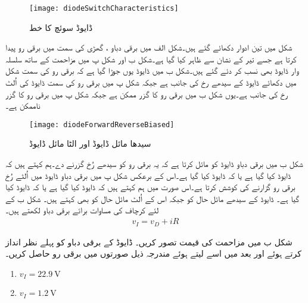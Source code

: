 \begin{figure}
\centering
\texttt{[image: diodeSwitchCharacteristics]}
\caption{ڈایوڈ سوئچ کا خط}
\label{شکل_ڈایوڈ_سوئچ_کا_خط}
\end{figure}
	شکل   میں تین ادوار دکھائے گئے ہیں۔شکل  الف میں برقی دباو ، گھڑی کی سمت میں برقی رو  پیدا کرتا ہے جسے تیر کے نشان سے ظاہر کیا گیا ہے۔شکل  ب اور شکل  پ میں مزاحمت کے ساتھ سلسلہ وار ڈایوڈ   بھی نسب کر دئے گئے ہیں۔شکل  ب میں ڈایوڈ   یوں جوڑا گیا ہے کہ برقی رو  کی سمت شکل   میں دکھائے ڈایوڈ کے سیدھے رخ کی جانب ہے جبکہ شکل  پ میں برقی رو کی سمت ڈایوڈ کی اُلٹ رخ کی جانب ہے۔یوں شکل  ب میں برقی رو  کا گزر ممکن ہے جبکہ شکل  پ میں برقی رو  کا گزر ناممکن ہے۔
\begin{figure}
\centering
\texttt{[image: diodeForwardReverseBiased]}
\caption{سیدھا مائل ڈایوڈ اور الٹا مائل ڈایوڈ}
\label{شکل_ڈایوڈ_سیدھا_مائل_الٹا_مائل}
\end{figure}
شکل  ب میں برقی دباو  ڈایوڈ   کو مائل کرتا ہے کہ یہ برقی رو کو سیدھے رُخ گزرنے دے۔ہم کہتے ہیں کہ ڈایوڈ     کیا گیا ہے یا کہ ڈایوڈ    کیا گیا ہے۔اس کے برعکس شکل  پ میں برقی دباو  ڈایوڈ   میں اُلٹے رُخ برقی رو گزارنے کی کوشش کرتا ہے۔اس صورت میں ہم کہتے ہیں کہ ڈایوڈ     کیا گیا ہے یا کہ ڈایوڈ    کیا گیا ہے۔ ڈایوڈ کے سیدھے مائل حال کو  جبکہ اس کے اُلٹ مائل حال کو  بھی کہتے ہیں۔ 
	شکل  ب کے لئے کرچاف  کی مساوات برائے برقی دباو لکھتے ہیں۔
\begin{align} \label{مساوات_ڈایوڈ_سیدھا_مائل_مثال_الف}
v_I=v_D+i R
\end{align}


شکل  ب میں مزاحمت کی قیمت  تصور کریں۔ ڈایوڈ کے برقی دباو  کو پہلے نظر انداز کرتے ہوئے اور بعد میں اسے  لیتے ہوئے مندرجہ ذیل صورتوں میں برقی رو حاصل کریں۔
\begin{enumerate}
\item
$v_I=\SI{22.9}{\volt}$
\item
$v_I=\SI{1.2}{\volt}$
\end{enumerate}

